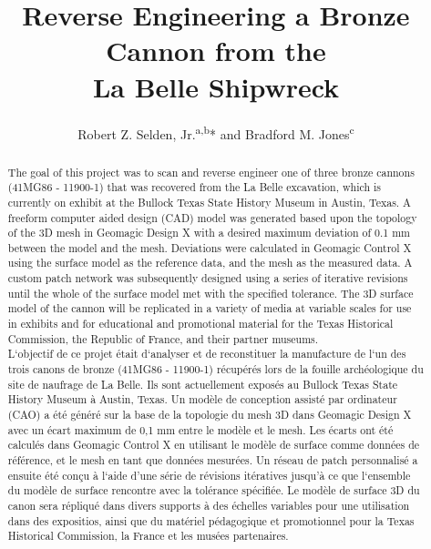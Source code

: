 \documentclass[review]{elsarticle}
\begin{document}
\begin{frontmatter}

\title{Reverse Engineering a Bronze Cannon from the\\La Belle Shipwreck}

\author{Robert Z. Selden, Jr.\textsuperscript{a,b}* and Bradford M. Jones\textsuperscript{c}}
\address[1]{Heritage Research Center, Stephen F. Austin State University, USA}
\address[2]{Cultural Heritage Department, Jean Monnet University, FR}
\address[3]{Archeology Division, Texas Historical Commission, Austin, USA}

\begin{abstract}
The goal of this project was to scan and reverse engineer one of three bronze cannons (41MG86 - 11900-1) that was recovered from the La Belle excavation, which is currently on exhibit at the Bullock Texas State History Museum in Austin, Texas. A freeform computer aided design (CAD) model was generated based upon the topology of the 3D mesh in Geomagic Design X with a desired maximum deviation of 0.1 mm between the model and the mesh. Deviations were calculated in Geomagic Control X using the surface model as the reference data, and the mesh as the measured data. A custom patch network was subsequently designed using a series of iterative revisions until the whole of the surface model met with the specified tolerance. The 3D surface model of the cannon will be replicated in a variety of media at variable scales for use in exhibits and for educational and promotional material for the Texas Historical Commission, the Republic of France, and their partner museums.
\\
L`objectif de ce projet était d`analyser et de reconstituer la manufacture de l`un des trois canons de bronze (41MG86 - 11900-1) récupérés lors de la fouille archéologique du site de naufrage de La Belle. Ils sont actuellement exposés au Bullock Texas State History Museum à Austin, Texas. Un modèle de conception assisté par ordinateur (CAO) a été généré sur la base de la topologie du mesh 3D dans Geomagic Design X avec un écart maximum  de 0,1 mm entre le modèle et le mesh. Les écarts ont été calculés dans Geomagic Control X en utilisant le modèle de surface comme données de référence, et le mesh en tant que données mesurées. Un réseau de patch personnalisé a ensuite été conçu à l`aide d'une série de révisions itératives jusqu'à ce que l`ensemble du modèle de surface rencontre avec la tolérance spécifiée. Le modèle de surface 3D du canon sera répliqué dans divers supports à des échelles variables pour une utilisation dans des expositios, ainsi que du matériel pédagogique et promotionnel pour la Texas Historical Commission, la France et les musées partenaires.
\end{abstract}


\end{frontmatter}
\end{document}
